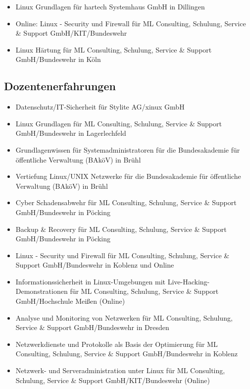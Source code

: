 \documentclass{article}
\begin{document}
\begin{itemize}
\item Linux Grundlagen für hartech Systemhaus GmbH in Dillingen
\item Online: Linux - Security und Firewall für ML Consulting, Schulung, Service \& Support GmbH/KIT/Bundeswehr
\item Linux Härtung für ML Consulting, Schulung, Service \& Support GmbH/Bundeswehr in Köln
\end{itemize}

\subsection{Dozentenerfahrungen}

\begin{itemize}
\item Datenschutz/IT-Sicherheit für Stylite AG/xinux GmbH
\item Linux Grundlagen für ML Consulting, Schulung, Service \& Support GmbH/Bundeswehr in Lagerlechfeld
\item Grundlagenwissen für Systemadministratoren für die Bundesakademie für öffentliche Verwaltung (BAköV) in Brühl
\item Vertiefung Linux/UNIX Netzwerke für die Bundesakademie für öffentliche Verwaltung (BAköV) in Brühl
\item Cyber Schadensabwehr für ML Consulting, Schulung, Service \& Support GmbH/Bundeswehr in Pöcking
\item Backup \& Recovery für ML Consulting, Schulung, Service \& Support GmbH/Bundeswehr in Pöcking
\item Linux - Security und Firewall für ML Consulting, Schulung, Service \& Support GmbH/Bundeswehr in Koblenz und Online
\item Informationssicherheit in Linux-Umgebungen mit Live-Hacking-Demonstrationen für ML Consulting, Schulung, Service \& Support GmbH/Hochschule Meißen (Online)
\item Analyse und Monitoring von Netzwerken für ML Consulting, Schulung, Service \& Support GmbH/Bundeswehr in Dresden
\item Netzwerkdienste und Protokolle als Basis der Optimierung für ML Consulting, Schulung, Service \& Support GmbH/Bundeswehr in Koblenz
\item Netzwerk- und Serveradministration unter Linux für ML Consulting, Schulung, Service \& Support GmbH/KIT/Bundeswehr (Online)
\end{itemize}
\end{document}
